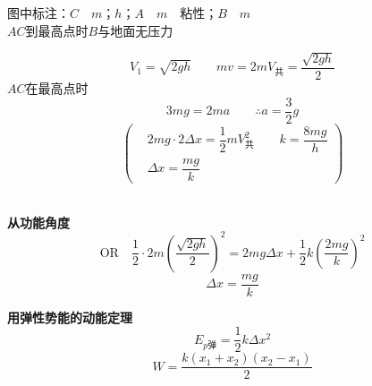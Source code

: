 \begin{problem}[⑤]
图中标注：$C$　$m$；$h$；$A$　$m$　粘性；$B$　$m$\\
$AC$到最高点时$B$与地面无压力
\begin{solution}
\[
V_1=\sqrt{2gh}\qquad mv=2mV_{\text{共}}=\dfrac{\sqrt{2gh}}{2}
\]%
$AC$在最高点时
\[
3mg=2ma\qquad\therefore a=\dfrac{3}{2}g
\]
\[
\left(\begin{aligned}
&2mg\cdot2\Delta x=\dfrac{1}{2}mV_{\text{共}}^2\qquad k=\dfrac{8mg}{h}\\
&\Delta x=\dfrac{mg}{k}
\end{aligned}\right)
\]%

\textbf{从功能角度}
\[
\text{OR}\quad\dfrac{1}{2}\cdot2m\left(\dfrac{\sqrt{2gh}}{2}\right)^2=2mg\Delta x+\dfrac{1}{2}k\left(\dfrac{2mg}{k}\right)^2
\]
\[
\Delta x=\dfrac{mg}{k}
\]
\end{solution}
\end{problem}
\textbf{用弹性势能的动能定理}
\[
E_{p\text{弹}}=\dfrac{1}{2}k\Delta x^2
\]
\[
W=\dfrac{k(x_1+x_2)(x_2-x_1)}{2}
\]
